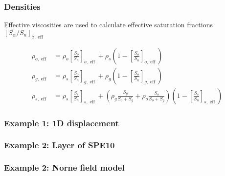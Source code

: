 \documentclass[screen, aspectratio=43]{beamer}
\DeclareMathOperator{\eff}{eff}
\begin{document}
\begin{frame}
  \frametitle{Densities}
  \vspace{0.2cm}

 
  Effective viscosities are used to calculate effective saturation fractions
  $[S_\alpha/S_n]_{\beta,\eff}$

  \begin{align*}
    \rho_{o,\eff} & = \rho_o\left[\frac{S_o}{S_n}\right]_{o,\eff} + \rho_s\left(1 - \left[\frac{S_o}{S_n}\right]_{o,\eff}\right) \\
    \rho_{g,\eff} & = \rho_s\left[\frac{S_o}{S_n}\right]_{g,\eff} + \rho_g\left(1 - \left[\frac{S_o}{S_n}\right]_{g,\eff}\right) \\
    \rho_{s,\eff} & = \rho_s\left[\frac{S_s}{S_n}\right]_{s,\eff}
                    + \left(\rho_g\frac{S_g}{S_o + S_g} + \rho_o\frac{S_o}{S_o + S_g}\right)\left(1 - \left[\frac{S_s}{S_n}\right]_{s,\eff}\right)
  \end{align*}
  
\end{frame}

\begin{frame}
  
  
\end{frame}

\begin{frame}
  \frametitle{Example 1: 1D displacement}
  
\end{frame}

\begin{frame}
  \frametitle{Example 2: Layer of SPE10}
  \begin{figure}[h]
    \centering
    
  \end{figure}
\end{frame}

\begin{frame}
  \frametitle{Example 2: Norne field model}
  
\end{frame}
\end{document}
